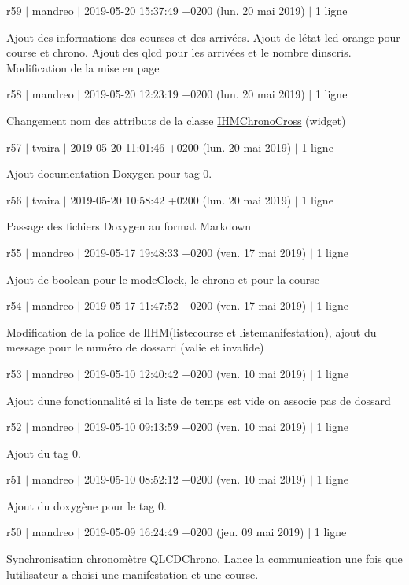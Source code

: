 r59 $\vert$ mandreo $\vert$ 2019-\/05-\/20 15\+:37\+:49 +0200 (lun. 20 mai 2019) $\vert$ 1 ligne

Ajout des informations des courses et des arrivées. Ajout de l\textquotesingle{}état led orange pour course et chrono. Ajout des qlcd pour les arrivées et le nombre d\textquotesingle{}inscris. Modification de la mise en page

r58 $\vert$ mandreo $\vert$ 2019-\/05-\/20 12\+:23\+:19 +0200 (lun. 20 mai 2019) $\vert$ 1 ligne

Changement nom des attributs de la classe \hyperlink{class_i_h_m_chrono_cross}{I\+H\+M\+Chrono\+Cross} (widget)

r57 $\vert$ tvaira $\vert$ 2019-\/05-\/20 11\+:01\+:46 +0200 (lun. 20 mai 2019) $\vert$ 1 ligne

Ajout documentation Doxygen pour tag 0.

r56 $\vert$ tvaira $\vert$ 2019-\/05-\/20 10\+:58\+:42 +0200 (lun. 20 mai 2019) $\vert$ 1 ligne

Passage des fichiers Doxygen au format Markdown

r55 $\vert$ mandreo $\vert$ 2019-\/05-\/17 19\+:48\+:33 +0200 (ven. 17 mai 2019) $\vert$ 1 ligne

Ajout de boolean pour le mode\+Clock, le chrono et pour la course

r54 $\vert$ mandreo $\vert$ 2019-\/05-\/17 11\+:47\+:52 +0200 (ven. 17 mai 2019) $\vert$ 1 ligne

Modification de la police de l\textquotesingle{}I\+H\+M(listecourse et listemanifestation), ajout du message pour le numéro de dossard (valie et invalide)

r53 $\vert$ mandreo $\vert$ 2019-\/05-\/10 12\+:40\+:42 +0200 (ven. 10 mai 2019) $\vert$ 1 ligne

Ajout d\textquotesingle{}une fonctionnalité si la liste de temps est vide on associe pas de dossard

r52 $\vert$ mandreo $\vert$ 2019-\/05-\/10 09\+:13\+:59 +0200 (ven. 10 mai 2019) $\vert$ 1 ligne

Ajout du tag 0.

r51 $\vert$ mandreo $\vert$ 2019-\/05-\/10 08\+:52\+:12 +0200 (ven. 10 mai 2019) $\vert$ 1 ligne

Ajout du doxygène pour le tag 0.

r50 $\vert$ mandreo $\vert$ 2019-\/05-\/09 16\+:24\+:49 +0200 (jeu. 09 mai 2019) $\vert$ 1 ligne

Synchronisation chronomètre Q\+L\+C\+D\+Chrono. Lance la communication une fois que l\textquotesingle{}utilisateur a choisi une manifestation et une course.

